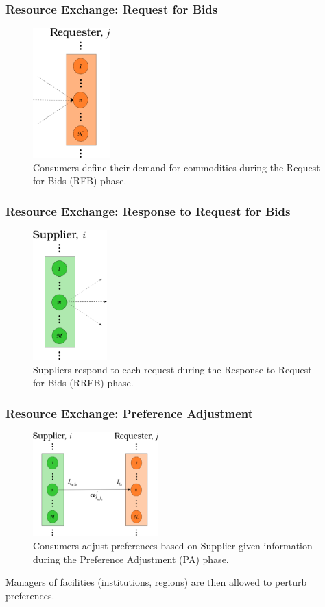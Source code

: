 \begin{frame}[ctb!]
  \frametitle{Resource Exchange: Request for Bids}
  \begin{figure}
    \includegraphics[height=5cm]{./images/requester.eps}
    \caption{Consumers define their demand for commodities during the Request
      for Bids (RFB) phase.}
  \end{figure}
\end{frame}

\begin{frame}[ctb!]
  \frametitle{Resource Exchange: Response to Request for Bids}
  \begin{figure}
    \includegraphics[height=5cm]{./images/supplier.eps}
    \caption{Suppliers respond to each request during the Response to Request
      for Bids (RRFB) phase.}
  \end{figure}
\end{frame}

\begin{frame}[ctb!]
  \frametitle{Resource Exchange: Preference Adjustment}
  \begin{figure}
    \includegraphics[height=4cm]{./images/supplier-requester.eps}
    \caption{Consumers adjust preferences based on Supplier-given information
      during the Preference Adjustment (PA) phase.}
  \end{figure}

  Managers of facilities (institutions, regions) are then allowed to perturb
  preferences.
\end{frame}

